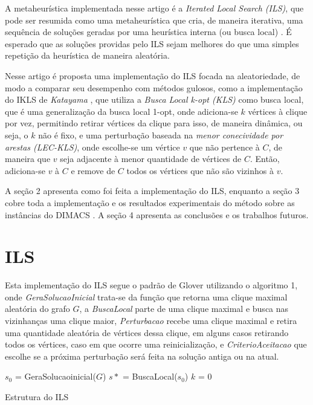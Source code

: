 \documentclass{article}
\begin{document}
A metaheurística implementada nesse artigo é a \textit{Iterated Local Search (ILS)}, que pode ser resumida como uma metaheurística que cria, de maneira iterativa, uma sequência de soluções geradas por uma heurística interna (ou busca local) \cite{handbook}. É esperado que as soluções providas pelo ILS sejam melhores do que uma simples repetição da heurística de maneira aleatória.

Nesse artigo é proposta uma implementação do ILS focada na aleatoriedade, de modo a comparar seu desempenho com métodos gulosos, como a implementação do IKLS de \textit{Katayama} \cite{kopt}, que utiliza a \textit{Busca Local k-opt (KLS)} \cite{KLS} como busca local, que é uma generalização da busca local 1-opt, onde adiciona-se $k$ vértices à clique por vez, permitindo retirar vértices da clique para isso, de maneira dinâmica, ou seja, o $k$ não é fixo,  e uma perturbação baseada na \textit{menor conecividade por arestas (LEC-KLS)}, onde escolhe-se um vértice $v$ que não pertence à $C$, de maneira que $v$ seja adjacente à menor quantidade de vértices de $C$. Então, adiciona-se $v$  à $C$ e remove de $C$ todos os vértices que não são vizinhos à $v$.\par

A seção 2 apresenta como foi feita a implementação do ILS, enquanto a seção 3 cobre toda a implementação e os resultados experimentais do método sobre as instâncias do DIMACS \cite{DIMACS2}. A seção 4 apresenta as conclusões e os trabalhos futuros.

\section{ILS}


Esta implementação do ILS segue o padrão de Glover \cite{handbook} utilizando o algoritmo 1, onde \textit{GeraSolucaoInicial} trata-se da função que retorna uma clique maximal aleatória do grafo $G$, a \textit{BuscaLocal} parte de uma clique maximal e busca nas vizinhanças uma clique maior, \textit{Perturbacao} recebe uma clique maximal e retira uma quantidade aleatória de vértices dessa clique, em alguns casos retirando todos os vértices, caso em que ocorre uma reinicialização, e \textit{CriterioAceitacao} que escolhe se a próxima perturbação será feita na solução antiga ou na atual.\par


\begin{algorithm}
 $s_0$ = GeraSolucaoinicial($G$)\;
 $s*$ = BuscaLocal($s_0$)\;
 $k$ = 0\;
 \caption{Estrutura do ILS}
\end{algorithm}
\end{document}
